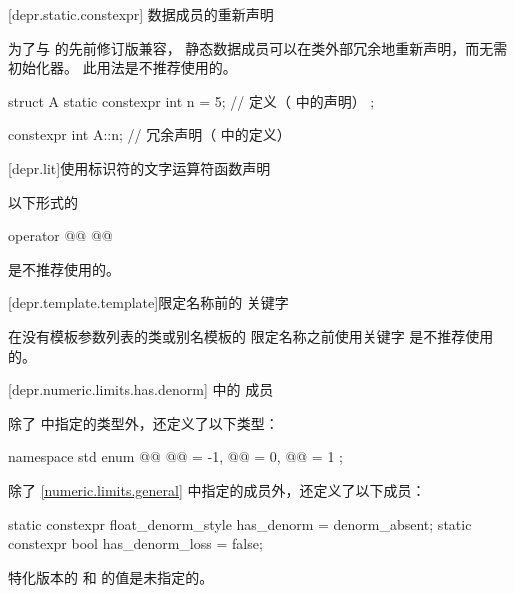 [depr.static.constexpr]{ 数据成员的重新声明}

\pnum
为了与 \Cpp{} 的先前修订版兼容，
静态数据成员可以在类外部冗余地重新声明，而无需
初始化器。
此用法是不推荐使用的。
\begin{example}
\begin{codeblock}
struct A {
  static constexpr int n = 5;   // 定义（\CppXIV{} 中的声明）
};

constexpr int A::n;             // 冗余声明（\CppXIV{} 中的定义）
\end{codeblock}
\end{example}

[depr.lit]{使用标识符的文字运算符函数声明}

\pnum
以下形式的 
\begin{codeblock}
operator @@ @@
\end{codeblock}
是不推荐使用的。

[depr.template.template]{限定名称前的  关键字}

\pnum
在没有模板参数列表的类或别名模板的
限定名称之前使用关键字 
是不推荐使用的。

[depr.numeric.limits.has.denorm]{ 中的  成员}

\pnum
除了  中指定的类型外，还定义了以下类型：
\begin{codeblock}
namespace std {
  enum @@ {
    @@ = -1,
    @@ = 0,
    @@ = 1
  };
}
\end{codeblock}

\pnum
{}%
%
%
%
除了 \ref{numeric.limits.general} 中指定的成员外，还定义了以下成员：
\begin{codeblock}
static constexpr float_denorm_style has_denorm = denorm_absent;
static constexpr bool has_denorm_loss = false;
\end{codeblock}

\pnum
{} 特化版本的  和  的值是未指定的。

